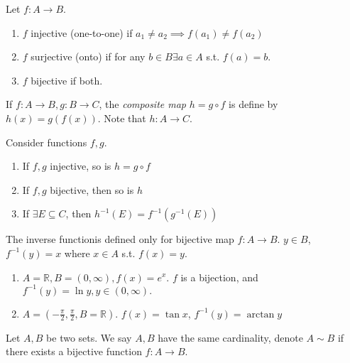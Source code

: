 \documentclass[12pt]{article}
\begin{document}
\begin{definition}
  Let $f: A \to B$.
  \begin{enumerate}
    \item $f$ injective (one-to-one) if $a_1 \neq a_2 \implies f(a_1) \neq f(a_2)$
    \item $f$ surjective (onto) if for any $b \in B \exists a \in A $ s.t. $f(a) = b$.
    \item $f$ bijective if both.
  \end{enumerate}
\end{definition}

\begin{definition}[Composition]
  If $f: A \to B, g: B \to C$, the \emph{composite map} $h = g \circ f$ is define by $h(x) = g(f(x))$. Note that $h: A \to C$.
\end{definition}

\begin{example}
  Consider functions $f,g$.
  \begin{enumerate}
    \item If $f, g$ injective, so is $h = g \circ f$
    \item If $f, g$ bijective, then so is $h$
    \item If $\exists E \subseteq C$, then $h^{-1}(E)= f^{-1}(g^{-1}(E))$
  \end{enumerate}  
\end{example}

\begin{definition}
  The inverse function\footnotemark is defined only for bijective map $f: A \to B$. $y \in B$, $f^{-1}(y) = x$ where $x \in A$ s.t. $f(x) = y$.
\end{definition}


\begin{example}
  \begin{enumerate}
    \item $A = \mathbb{R}, B = (0, \infty),f(x) = e^x$. $f$ is a bijection, and $f^{-1}(y) = \ln y, y \in (0, \infty).$
    \item $A = (-\frac{\pi}{2}, \frac{\pi}{2}, B = \mathbb{R})$. $f(x) = \tan x$, $f^{-1}(y) = \arctan y$
  \end{enumerate}
\end{example}

\begin{definition}
  Let $A,B$ be two sets. We say $A, B$ have the same cardinality, denote $A \sim B$ if there exists a bijective function $f: A \to B$.
\end{definition}
\end{document}
